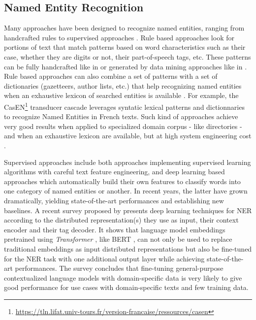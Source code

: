\subsection{Named Entity Recognition}

Many approaches have been designed to recognize named entities, ranging from handcrafted rules to supervised approaches \cite{nadeau2007}. Rule based approaches look for portions of text that match patterns based on word characteristics such as their case, whether they are digits or not, their part-of-speech tags, etc. These patterns can be fully handcrafted like in \cite{bell2020automated} or generated by data mining approaches like in \cite{nouvel2011}. Rule based approaches can also combine a set of patterns with a set of dictionaries (gazetteers, author lists, etc.) that help recognizing named entities when an exhaustive lexicon of searched entities is available \cite{mansouri2008,maurel2011}. For example, the CasEN\footnote{\url{https://tln.lifat.univ-tours.fr/version-francaise/ressources/casen}} transducer cascade leverages syntatic lexical patterns and dictionnaries to recognize Named Entities in French texts. Such kind of approaches achieve very good results when applied to specialized domain corpus - like directories - and when an exhaustive lexicon are available, but at high system engineering cost \cite{nadeau2007}. 

Supervised approaches include both approaches implementing supervised learning algorithms with careful text feature engineering, and deep learning based approaches which automatically build their own features to classify words into one category of named entities or another. In recent years, the latter have grown dramatically, yielding state-of-the-art performances and establishing new baselines\cite{li2020}. A recent survey proposed by \cite{li2020} presents deep learning techniques for NER according to the distributed representation(s) they use as input, their context encoder and their tag decoder. It shows that language model embeddings pretrained using \textit{Transformer} \cite{vaswani2017attention}, like BERT \cite{devlin2018bert}, can not only be used to replace traditional embeddings as input distributed representations but also be fine-tuned for the NER task with one additional output layer while achieving state-of-the-art performances. The survey concludes that fine-tuning general-purpose contextualized language models with domain-specific data is very likely to give good performance for use cases with domain-specific texts and few training data.

